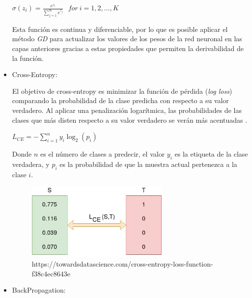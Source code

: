 \begin{itemize}
                    \begin{center}
                        $\sigma(z_i) = \frac{e^{z_{i}}}{\sum_{j=1}^K e^{z_{j}}} \ \ \ for\ i=1,2,\dots,K$
                    \end{center}


                    Esta función es continua y diferenciable, por lo que es posible aplicar el método \textit{GD} para actualizar los valores de los pesos de la red neuronal en las capas anteriores gracias a estas propiedades que permiten la derivabilidad de la función.


                \item Cross-Entropy:

                    El objetivo de cross-entropy es minimizar la función de pérdida (\textit{log loss}) comparando la probabilidad de la clase predicha con respecto a su valor verdadero. Al aplicar una penalización logarítmica, las probabilidades de las clases que más disten respecto a su valor verdadero se verán más acentuadas \cite{Cross-Entropy}.

                    \begin{center}
                        $L_{CE} = -\sum_{i = 1}^n y_i \log_2(p_i)$
                    \end{center}

                    Donde $n$ es el número de clases a predecir, el valor $y_i$ es la etiqueta de la clase verdadera, y $p_i$ es la probabilidad de que la muestra actual pertenezca a la clase $i$.

                    \begin{figure}[h]
                        \centering
                        \includegraphics[width=7cm]{archivos/CNN/CrossEntropy}
                        \caption{https://towardsdatascience.com/cross-entropy-loss-function-f38c4ec8643e}
                        \label{CrossEntropyImage}
                     \end{figure}

                \item BackPropagation:


\end{itemize}
